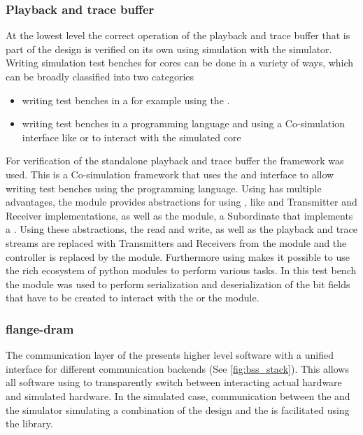 \subsubsection{Playback and trace buffer}
At the lowest level the correct operation of the playback and trace buffer that is part of the \FPGA{} design is verified on its own using simulation with the \xcelium{} simulator.
Writing simulation test benches for \FPGA{} cores can be done in a variety of ways, which can be broadly classified into two categories
\begin{itemize}
    \item writing test benches in a \hdl{} for example using the \uvmframework{}\autocite{ref:uvm}.
    \item writing test benches in a programming language and using a Co-simulation interface like \VPI{}\autocite{ref:vpi} or \DPI{}\autocite{ref:dpi} to interact with the simulated \FPGA{} core
\end{itemize}
For verification of the standalone playback and trace buffer the \cocotb{} framework was used. This is a Co-simulation framework that uses the \VPI{} and \VHPI{}\autocite{ref:vhpi} interface to allow writing test benches using the \python{} programming language. Using \cocotb{} has multiple advantages, the \cocotbaxi{} module provides abstractions for using \AXI{}, like \AXI{} and \AXIStream{} Transmitter and Receiver implementations, as well as the \AXIRAM{} module, a \AXI{} Subordinate that implements a \RAM{}. Using these abstractions, the \HostARQ{} read and write, as well as the playback and trace streams are replaced with \AXIStream{} Transmitters and Receivers from the \cocotbaxi{} module and the \AXI{} \DRAM{} controller is replaced by the \AXIRAM{} module.
Furthermore using \python{} makes it possible to use the rich ecosystem of python modules to perform various tasks. In this test bench the \construct{} module was used to perform serialization and deserialization of the bit fields that have to be created to interact with the \FAXI{} or the \AXIDMA{} module.

\subsubsection{flange-dram}
The communication layer of the \bssTwoOS{} presents higher level software with a unified interface for different communication backends (See \autoref{fig:bss_stack}). This allows all software using \hxcomm{} to transparently switch between interacting actual hardware and simulated hardware. In the simulated case, communication between the \hxcomm{} and the simulator simulating a combination of the \FPGA{} design and the \ASIC{} is facilitated using the \flange{} library.

